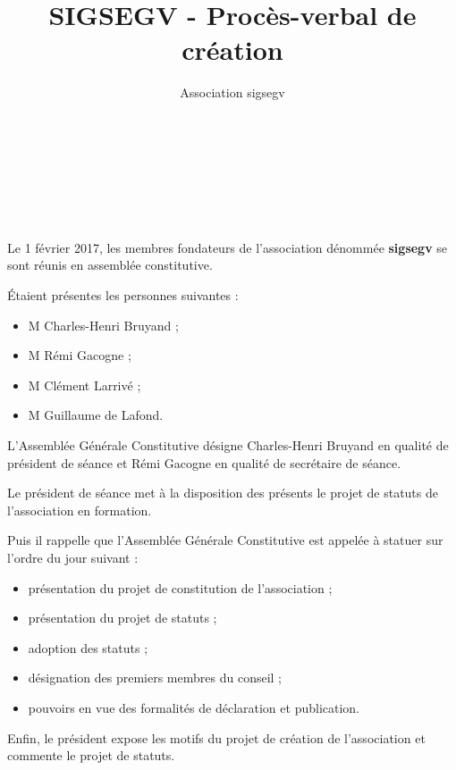 \documentclass[a4paper,oneside,12pt]{article}
\begin{document}
\author{Association sigsegv}
\title{SIGSEGV - Procès-verbal de création}

{ \\
}
\vspace{5mm}
{\centering {\textbf {\Huge -}}\\
}
\vspace{5mm}
{\\
}

\section*{}

Le 1 février 2017, les membres fondateurs de l'association dénommée \textbf {sigsegv} se sont réunis en assemblée constitutive.

\'Etaient présentes les personnes suivantes :

\begin{itemize}
\item M Charles-Henri Bruyand ;
\item M Rémi Gacogne ;
\item M Clément Larrivé ;
\item M Guillaume de Lafond.
\end{itemize}

L’Assemblée Générale Constitutive désigne Charles-Henri Bruyand en qualité de président de séance et Rémi Gacogne en qualité de secrétaire de séance.

Le président de séance met à la disposition des présents le projet de statuts de l’association en formation.

Puis il rappelle que l’Assemblée Générale Constitutive est appelée à statuer sur l’ordre du jour suivant :

\begin{itemize}
\item présentation du projet de constitution de l’association ;
\item présentation du projet de statuts ;
\item adoption des statuts ;
\item désignation des premiers membres du conseil ;
\item pouvoirs en vue des formalités de déclaration et publication.
\end{itemize}

Enfin, le président expose les motifs du projet de création de l’association et commente le projet de statuts.
\end{document}
